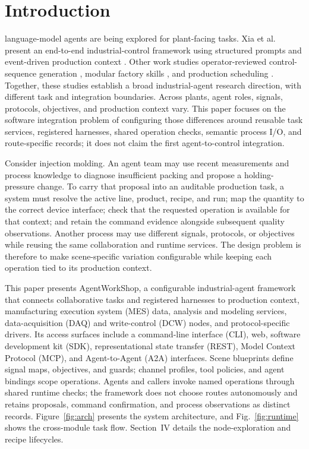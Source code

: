 \section{Introduction}
 language-model agents are being explored for
plant-facing tasks. Xia et al. present an end-to-end industrial-control
framework using structured prompts and event-driven production context
\cite{xia2025control}. Other work studies operator-reviewed control-sequence
generation \cite{huang2026made}, modular factory skills
\cite{koehle2026llmdriven}, and production scheduling
\cite{waseem2026pretrained}. Together, these studies establish a broad
industrial-agent research direction, with different task and integration
boundaries. Across plants, agent roles, signals, protocols, objectives, and
production context vary. This paper focuses on the software integration
problem of configuring those differences around reusable task services,
registered harnesses, shared operation checks, semantic process I/O, and
route-specific records; it does not claim the first agent-to-control
integration.

Consider injection molding. An agent team may use recent measurements and
process knowledge to diagnose insufficient packing and propose a holding-
pressure change. To carry that proposal into an auditable production task, a
system must resolve the active line, product, recipe, and run; map the
quantity to the correct device interface; check that the requested operation
is available for that context; and retain the command evidence alongside
subsequent quality observations. Another process may use different signals,
protocols, or objectives while reusing the same collaboration and runtime
services. The design problem is therefore to make scene-specific variation
configurable while keeping each operation tied to its production context.

This paper presents AgentWorkShop, a configurable industrial-agent framework
that connects collaborative tasks and registered harnesses to production
context, manufacturing execution system (MES) data, analysis and modeling
services, data-acquisition (DAQ) and write-control (DCW) nodes, and
protocol-specific drivers. Its access surfaces include a command-line
interface (CLI), web, software development kit (SDK), representational state
transfer (REST), Model Context Protocol (MCP), and Agent-to-Agent (A2A)
interfaces.
Scene blueprints define signal maps, objectives, and guards; channel profiles,
tool policies, and agent bindings scope operations. Agents and callers invoke
named operations through shared runtime checks; the framework does not choose
routes autonomously and retains proposals, command confirmation, and process
observations as distinct records. Figure~\ref{fig:arch} presents the system
architecture, and Fig.~\ref{fig:runtime} shows the cross-module task flow.
Section~IV details the node-exploration and recipe lifecycles.

